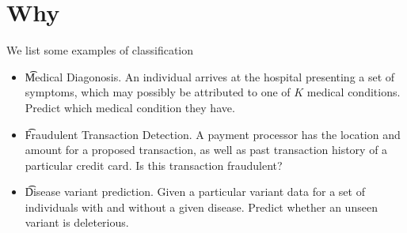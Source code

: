 

\section*{Why}

We list some examples of classification

\begin{itemize}
  \item \t{Medical Diagonosis}.
An individual arrives at the hospital presenting a set of symptoms, which may possibly be attributed to one of $K$ medical conditions. Predict which medical condition they have.
  \item \t{Fraudulent Transaction Detection}.
A payment processor has the location and amount for a proposed transaction, as well as past transaction history of a particular credit card. Is this transaction fraudulent?
  \item \t{Disease variant prediction}.
Given a particular variant data for a set of individuals with and without a given disease. Predict whether an unseen variant is deleterious.
\end{itemize}
\blankpage